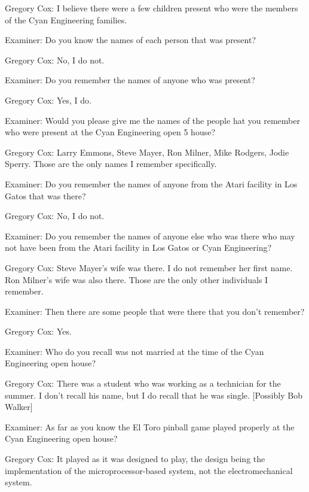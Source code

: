 \textcolor{interviewee}{Gregory Cox:} I believe there were a few children present who were the members of the Cyan Engineering families.

\textcolor{interviewer}{Examiner:} Do you know the names of each person that was present? 

\textcolor{interviewee}{Gregory Cox:} No, I do not.

\textcolor{interviewer}{Examiner:} Do you remember the names of anyone who was present? 

\textcolor{interviewee}{Gregory Cox:} Yes, I do. 

\textcolor{interviewer}{Examiner:} Would you please give me the names of the people hat you remember who were present at the Cyan Engineering open 5 house?

\textcolor{interviewee}{Gregory Cox:} Larry Emmons, Steve Mayer, Ron Milner, Mike Rodgers, Jodie Sperry. Those are the only names I remember specifically.

\textcolor{interviewer}{Examiner:} Do you remember the names of anyone from the Atari facility in Los Gatos that was there? 

\textcolor{interviewee}{Gregory Cox:} No, I do not. 

\textcolor{interviewer}{Examiner:} Do you remember the names of anyone else who was there who may not have been from the Atari facility in Los Gatos or Cyan Engineering?

\textcolor{interviewee}{Gregory Cox:} Steve Mayer's wife was there. I do not remember her first name. Ron Milner's wife was also there. Those are the only other individuals I remember. 

\textcolor{interviewer}{Examiner:} Then there are some people that were there that you don't remember? 

\textcolor{interviewee}{Gregory Cox:} Yes. 

\textcolor{interviewer}{Examiner:} Who do you recall was not married at the time of the Cyan Engineering open house? 

\textcolor{interviewee}{Gregory Cox:} There was a student who was working as a technician for the summer. I don't recall his name, but I do recall that he was single. [Possibly Bob Walker]

\textcolor{interviewer}{Examiner:} As far as you know the El Toro pinball game played properly at the Cyan Engineering open house? 

\textcolor{interviewee}{Gregory Cox:} It played as it was designed to play, the design being the implementation of the microprocessor-based system, not the electromechanical system. 

